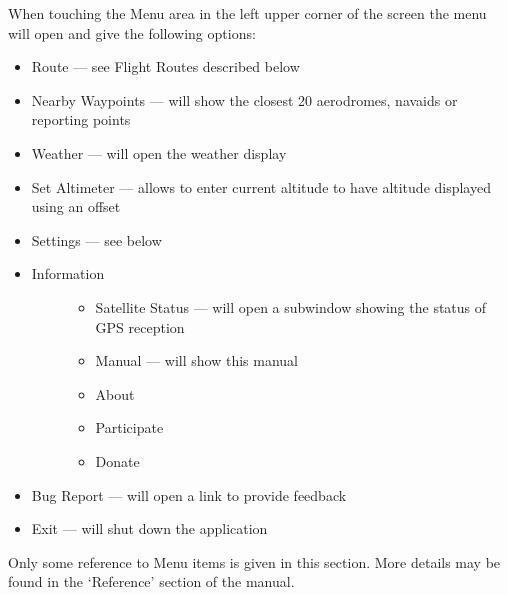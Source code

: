 \documentclass[letterpaper,10pt,english]{sphinxmanual}
\begin{document}
\sphinxAtStartPar
When touching the Menu area in the left upper corner of the screen the menu will open and give the following options:
\begin{itemize}
\item {} 
\sphinxAtStartPar
Route — see Flight Routes described below

\item {} 
\sphinxAtStartPar
Nearby Waypoints  — will show the closest 20 aerodromes, navaids or reporting points

\item {} 
\sphinxAtStartPar
Weather   — will open the weather display

\item {} 
\sphinxAtStartPar
Set Altimeter — allows to enter current altitude to have altitude displayed using an offset

\item {} 
\sphinxAtStartPar
Settings — see below

\item {} \begin{description}
\item[{Information}] \leavevmode\begin{itemize}
\item {} 
\sphinxAtStartPar
Satellite Status  — will open a sub\sphinxhyphen{}window showing the status of GPS reception

\item {} 
\sphinxAtStartPar
Manual — will show this manual

\item {} 
\sphinxAtStartPar
About 

\item {} 
\sphinxAtStartPar
Participate

\item {} 
\sphinxAtStartPar
Donate

\end{itemize}

\end{description}

\item {} 
\sphinxAtStartPar
Bug Report — will open a link to provide feedback

\item {} 
\sphinxAtStartPar
Exit — will shut down the application

\end{itemize}

\sphinxAtStartPar
Only some reference to Menu items is given in this section. More details may be found in the ‘Reference’ section of  the manual.
\end{document}
